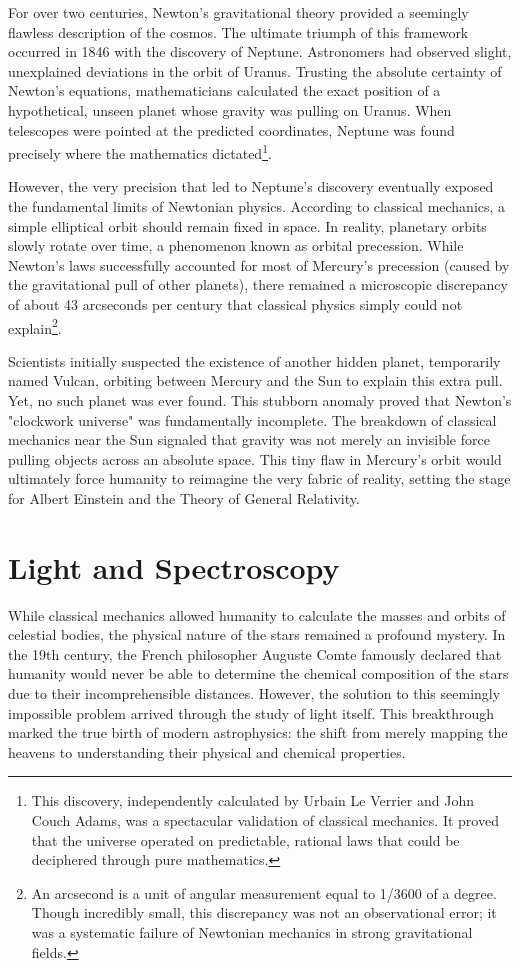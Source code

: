 \documentclass[10pt,a4paper]{article}
\begin{document}
For over two centuries, Newton's gravitational theory provided a seemingly flawless description of the cosmos. The ultimate triumph of this framework occurred in 1846 with the discovery of Neptune. Astronomers had observed slight, unexplained deviations in the orbit of Uranus. Trusting the absolute certainty of Newton's equations, mathematicians calculated the exact position of a hypothetical, unseen planet whose gravity was pulling on Uranus. When telescopes were pointed at the predicted coordinates, Neptune was found precisely where the mathematics dictated\footnote{This discovery, independently calculated by Urbain Le Verrier and John Couch Adams, was a spectacular validation of classical mechanics. It proved that the universe operated on predictable, rational laws that could be deciphered through pure mathematics.}.

However, the very precision that led to Neptune's discovery eventually exposed the fundamental limits of Newtonian physics. According to classical mechanics, a simple elliptical orbit should remain fixed in space. In reality, planetary orbits slowly rotate over time, a phenomenon known as orbital precession. While Newton's laws successfully accounted for most of Mercury's precession (caused by the gravitational pull of other planets), there remained a microscopic discrepancy of about 43 arcseconds per century that classical physics simply could not explain\footnote{ An arcsecond is a unit of angular measurement equal to 1/3600 of a degree. Though incredibly small, this discrepancy was not an observational error; it was a systematic failure of Newtonian mechanics in strong gravitational fields.}.

Scientists initially suspected the existence of another hidden planet, temporarily named Vulcan, orbiting between Mercury and the Sun to explain this extra pull. Yet, no such planet was ever found. This stubborn anomaly proved that Newton's "clockwork universe" was fundamentally incomplete. The breakdown of classical mechanics near the Sun signaled that gravity was not merely an invisible force pulling objects across an absolute space. This tiny flaw in Mercury's orbit would ultimately force humanity to reimagine the very fabric of reality, setting the stage for Albert Einstein and the Theory of General Relativity.

\section{Light and Spectroscopy}
While classical mechanics allowed humanity to calculate the masses and orbits of celestial bodies, the physical nature of the stars remained a profound mystery. In the 19th century, the French philosopher Auguste Comte famously declared that humanity would never be able to determine the chemical composition of the stars due to their incomprehensible distances. However, the solution to this seemingly impossible problem arrived through the study of light itself. This breakthrough marked the true birth of modern astrophysics: the shift from merely mapping the heavens to understanding their physical and chemical properties.
\end{document}
